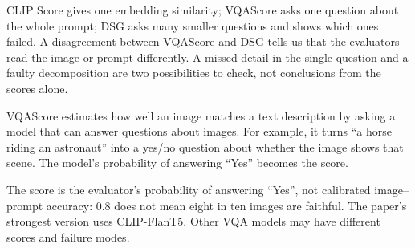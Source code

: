 \metricsecondary

CLIP Score gives one embedding similarity; VQAScore asks one question about the whole prompt; DSG asks many smaller questions and shows
which ones failed. A disagreement between VQAScore and DSG tells us that the evaluators read the image or prompt differently. A missed
detail in the single question and a faulty decomposition are two possibilities to check, not conclusions from the scores alone.

\metricend
\clearpage
\thispagestyle{genaistyle}
\label{sec:vqascore}


VQAScore estimates how well an image matches a text description by asking a model that can answer questions about images. For example,
it turns ``a horse riding an astronaut'' into a yes/no question about whether the image shows that scene. The model's probability of
answering ``Yes'' becomes the score.

\begin{metricformula}
\end{metricformula}

The score is the evaluator's probability of answering ``Yes'', not calibrated image--prompt accuracy: $0.8$ does not mean eight in ten images are faithful. The paper's strongest version uses CLIP-FlanT5. Other VQA models may have different scores and failure modes.

